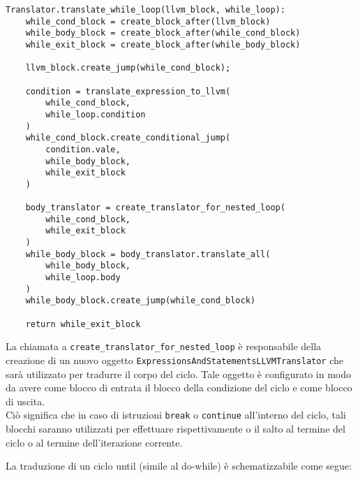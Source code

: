 \vspace{0.5cm}
\begin{lstlisting}[frame=single]
Translator.translate_while_loop(llvm_block, while_loop):
    while_cond_block = create_block_after(llvm_block)
    while_body_block = create_block_after(while_cond_block)
    while_exit_block = create_block_after(while_body_block)

    llvm_block.create_jump(while_cond_block);

    condition = translate_expression_to_llvm(
        while_cond_block, 
        while_loop.condition
    )
    while_cond_block.create_conditional_jump(
        condition.vale, 
        while_body_block, 
        while_exit_block
    )

    body_translator = create_translator_for_nested_loop(
        while_cond_block, 
        while_exit_block
    )
    while_body_block = body_translator.translate_all(
        while_body_block,
        while_loop.body
    )
    while_body_block.create_jump(while_cond_block)

    return while_exit_block
\end{lstlisting}
\vspace{0.5cm}

La chiamata a \texttt{create\_translator\_for\_nested\_loop} è responsabile della creazione di un nuovo oggetto
\texttt{ExpressionsAndStatementsLLVMTranslator} che sarà utilizzato per tradurre il corpo del ciclo. Tale oggetto
è configurato in modo da avere come blocco di entrata il blocco della condizione del ciclo e come blocco di uscita. \\

Ciò significa che in caso di istruzioni \texttt{break} o \texttt{continue} all'interno del ciclo, tali blocchi saranno 
utilizzati per effettuare rispettivamente o il salto al termine del ciclo o al termine dell'iterazione corrente. \\

\newpage

La traduzione di un ciclo until (simile al do-while) è schematizzabile come segue: